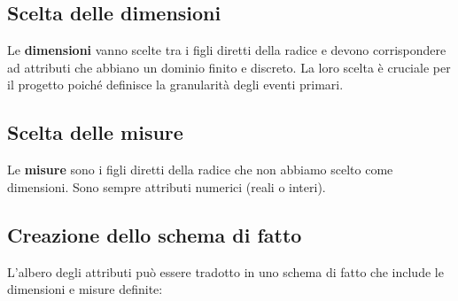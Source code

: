  \subsection{Scelta delle dimensioni}
 Le \textbf{dimensioni} vanno scelte tra i figli diretti della radice e devono corrispondere ad attributi che abbiano un dominio finito e discreto. La loro scelta è cruciale per il progetto poiché definisce la granularità degli eventi primari. 
\subsection{Scelta delle misure}
Le \textbf{misure} sono i figli diretti della radice che non abbiamo scelto come dimensioni. Sono sempre attributi numerici (reali o interi). 
\subsection{Creazione dello schema di fatto} 
L’albero degli attributi può essere tradotto in uno schema di fatto che include le dimensioni e misure definite:
